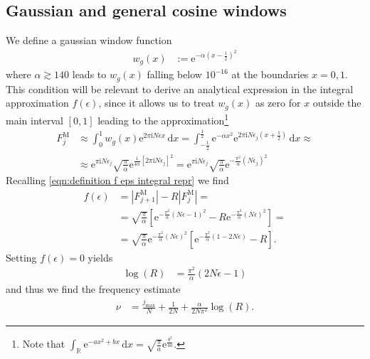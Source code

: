\documentclass[english, parskip=full]{scrartcl}     %
\newcommand{\intx}{}
\newcommand{\intr}{}
\newcommand{\kla}{}
\newcommand{\klam}{}
\newcommand{\tecxt}{}
\renewcommand{\i}{\text{i}}
\newcommand{\e}{\text{e}}
\begin{document}
\subsection{Gaussian and general cosine windows}
We define a gaussian window function
\begin{align}
w_g(x) &:= \e^{-\alpha \kla\left( x - \frac{1}{2} \right)^2} \label{eqn:definition gaussian window}
\end{align}
where $\alpha \gtrsim 140$ leads to $w_g(x)$ falling below $10^{-16}$ at the boundaries $x=0,1$.
This condition will be relevant to derive an analytical expression in the integral approximation $f(\epsilon)$, since it allows us to treat $w_g(x)$ as zero for $x$ outside the main interval $[0,1]$ leading to the approximation\footnote{Note that $\intr\int_{\mathbb{R}^{ }} \e^{-ax^2 + bx} \, \mathrm{d}x = \sqrt{\frac{\pi}{a}} \e^{\frac{b^2}{4a}}$.}
\begin{align}
F_j^\tecxt\text{M} &\approx \intx\int_{0}^{1} w_g(x) \e^{2\pi\i N\epsilon x} \, \mathrm{d}x = \int_{-\frac{1}{2}}^{\frac{1}{2}} \e^{-\alpha x^2} \e^{2\pi\i N\epsilon_j \kla\left( x + \frac{1}{2} \right)} \, \mathrm{d}x \approx \\
&\approx \e^{\pi\i N\epsilon_j} \sqrt{\frac{\pi}{\alpha}} \e^{\frac{1}{4\alpha} \klam\left[ 2\pi\i N\epsilon_j \right]^2} = \e^{\pi\i N\epsilon_j} \sqrt{\frac{\pi}{\alpha}} \e^{-\frac{\pi^2}{\alpha} (N\epsilon_j)^2 }
\end{align}
Recalling \autoref{eqn:definition f eps integral repr} we find
\begin{align}
f(\epsilon) &= \left\vert F_{j+1}^\tecxt\text{M} \right\vert - R \left\vert F_j^\tecxt\text{M} \right\vert = \\
&= \sqrt{\frac{\pi}{\alpha}} \klam\left[ \e^{-\frac{\pi^2}{\alpha} \kla\left( N\epsilon - 1 \right)^2} - R\e^{-\frac{\pi^2}{\alpha} (N\epsilon)^2}  \right] = \\
&= \sqrt{\frac{\pi}{\alpha}} \e^{-\frac{\pi^2}{\alpha} (N\epsilon)^2} \klam\left[ \e^{-\frac{\pi^2}{\alpha} \kla\left( 1 - 2N\epsilon \right)} - R  \right]. 
\end{align}
Setting $f(\epsilon) = 0$ yields
\begin{align}
\log (R) &= \frac{\pi^2}{\alpha} \kla\left( 2N\epsilon - 1 \right)
\end{align}
and thus we find the frequency estimate
\begin{align}
\nu &= \frac{j_\tecxt\text{max}}{N} + \frac{1}{2N} + \frac{\alpha}{2N\pi^2} \log (R). \label{eqn:gauss naff approx nu}
\end{align}
\end{document}
